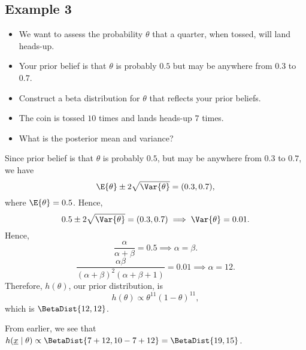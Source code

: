 \subsection*{Example 3}
\begin{itemize}
      \item We want to assess the probability $ \theta $ that a quarter, when tossed, will
            land heads-up.
      \item Your prior belief is that $ \theta $ is probably $0.5$ but may be anywhere from $0.3$
            to $0.7$.
      \item Construct a beta distribution for $ \theta $ that reflects your prior beliefs.
      \item The coin is tossed $10$ times and lands heads-up $7$ times.
      \item What is the posterior mean and variance?
\end{itemize}
\begin{framed}
      Since prior belief is that $ \theta $ is probably $0.5$, but may be anywhere from $0.3$
      to $0.7$, we have
      \[ \E{\theta}\pm 2\sqrt{\Var{\theta}}=(0.3,0.7), \]
      where $ \E{\theta}=0.5 $. Hence,
      \[ 0.5\pm 2\sqrt{\Var{\theta}}=(0.3,0.7)\implies \Var{\theta}=0.01. \]
      Hence,
      \[ \frac{\alpha}{\alpha+\beta}=0.5\implies \alpha=\beta. \]
      \[ \frac{\alpha\beta}{(\alpha+\beta)^2(\alpha+\beta+1)}=0.01\implies \alpha=12.  \]
      Therefore, $ h(\theta) $, our prior distribution, is
      \[ h(\theta)\propto \theta^{11}(1-\theta)^{11}, \]
      which is $ \BetaDist{12,12} $.

      From earlier, we see that $ h(\Vector{x}\mid \theta)\propto \BetaDist{7+12,10-7+12}=\BetaDist{19,15} $.
\end{framed}